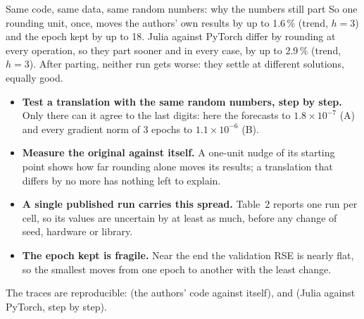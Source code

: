 \begin{pbox}[breakable]{Same code, same data, same random numbers: why the numbers still part}
So one rounding unit, once, moves the authors' own results by up to 1.6\,\% (trend, $h = 3$) and the epoch kept by up to
18. Julia against PyTorch differ by rounding at every operation, so they part sooner and in every case, by up to
2.9\,\% (trend, $h = 3$). After parting, neither run gets worse: they settle at different solutions, equally good.

\begin{itemize}
  \item \textbf{Test a translation with the same random numbers, step by step.} Only there can it agree to the last
    digits: here the forecasts to $1.8\times10^{-7}$ (A) and every gradient norm of 3 epochs to $1.1\times10^{-6}$ (B).
  \item \textbf{Measure the original against itself.} A one-unit nudge of its starting point shows how far rounding alone
    moves its results; a translation that differs by no more has nothing left to explain.
  \item \textbf{A single published run carries this spread.} Table~2 reports one run per cell, so its values are uncertain
    by at least as much, before any change of seed, hardware or library.
  \item \textbf{The epoch kept is fragile.} Near the end the validation RSE is nearly flat, so the smallest moves from one
    epoch to another with the least change.
\end{itemize}
The traces are reproducible:  (the authors' code against itself),
 and  (Julia against PyTorch, step by step).
\end{pbox}
